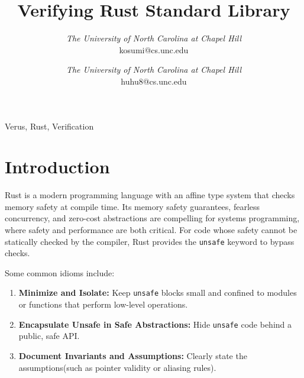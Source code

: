 \documentclass[conference]{IEEEtran}
\begin{document}
\title{Verifying Rust Standard Library}

\author{
\textit{The University of North Carolina at
Chapel Hill}\\
kosumi@cs.unc.edu
\and
{}
\textit{The University of North Carolina at
Chapel Hill}\\
huhu8@cs.unc.edu}
\maketitle


\begin{IEEEkeywords}
Verus, Rust, Verification 
\end{IEEEkeywords}

\section{Introduction}
Rust\cite{matsakis2014rust} is a modern programming language with an affine type system that checks memory safety at compile time. Its memory safety guarantees, fearless concurrency, and zero-cost abstractions are compelling for systems programming, where safety and performance are both critical. For code whose safety cannot be statically checked by the compiler, Rust provides the \texttt{unsafe} keyword to bypass checks. 


Some common idioms include:
\begin{enumerate}
    \item \textbf{Minimize and Isolate:} Keep \texttt{unsafe} blocks small and confined to modules or functions that perform low-level operations. 
    \item \textbf{Encapsulate Unsafe in Safe Abstractions:} Hide \texttt{unsafe} code behind a public, safe API. 
    \item \textbf{Document Invariants and Assumptions:} Clearly state the assumptions(such as pointer validity or aliasing rules). 
\end{enumerate}
\end{document}
